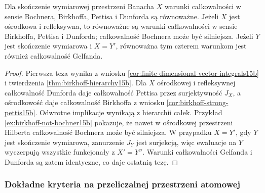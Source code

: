 \begin{wniosek}
\label{cor:four-integrals-special-spaces15b}
Dla skończenie wymiarowej przestrzeni Banacha $X$
warunki całkowalności w sensie Bochnera, Birkhoffa,
Pettisa i Dunforda są równoważne.
Jeżeli $X$ jest ośrodkowa i refleksywna, to równoważne
są warunki całkowalności w sensie Birkhoffa, Pettisa
i Dunforda; całkowalność Bochnera może być silniejsza.
Jeżeli $Y$ jest skończenie wymiarowa i $X=Y'$,
równoważna tym czterem warunkom jest również
całkowalność Gelfanda.
\end{wniosek}
\begin{proof}
Pierwsza teza wynika z wniosku
\ref{cor:finite-dimensional-vector-integrals15b}
i twierdzenia \ref{thm:birkhoff-hierarchy15b}.
Dla $X$ ośrodkowej i refleksywnej całkowalność Dunforda
daje całkowalność Pettisa przez surjektywność $J_X$,
a ośrodkowość daje całkowalność Birkhoffa z wniosku
\ref{cor:birkhoff-strong-pettis15b}.
Odwrotne implikacje wynikają z hierarchii całek.
Przykład \ref{ex:birkhoff-not-bochner15b} pokazuje,
że nawet w ośrodkowej przestrzeni Hilberta całkowalność
Bochnera może być silniejsza. W przypadku $X=Y'$,
gdy $Y$ jest skończenie wymiarowa, zanurzenie $J_Y$
jest surjekcją, więc ewaluacje na $Y$ wyczerpują
wszystkie funkcjonały z $X'=Y''$.
Warunki całkowalności Gelfanda i Dunforda są zatem
identyczne, co daje ostatnią tezę.
\end{proof}

\subsubsection{Dokładne kryteria na przeliczalnej przestrzeni atomowej}

